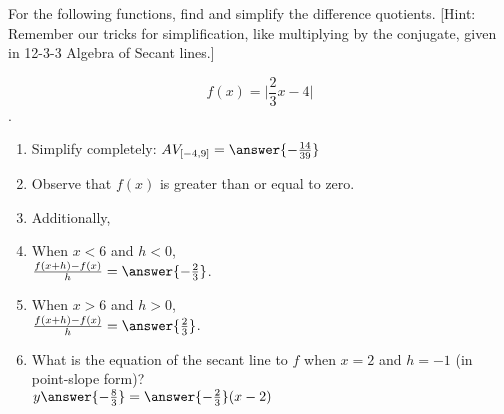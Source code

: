 \documentclass{ximera}
\author{Elizabeth Campolongo}
\begin{document}
\begin{exercise}

For the following functions, 
find and simplify the difference quotients. [Hint: Remember our tricks for simplification, like multiplying by the conjugate, given in 12-3-3 Algebra of Secant lines.]

$$f(x)= \Big|\frac{2}{3}x-4\Big|$$.

\begin{enumerate}

\item Simplify completely:
$AV_{[-4,9]} = \answer{-\frac{14}{39}}$
\item Observe that $f(x)$ is  greater than or equal to zero.
\item Additionally,
\begin{multipleChoice}
\end{multipleChoice}

\item When $x<6$ and $h<0$,\\
$\frac{f(x+h)-f(x)}{h} = \answer{-\frac{2}{3}}$.  

\item When $x>6$ and $h>0$,\\
$\frac{f(x+h)-f(x)}{h} = \answer{\frac{2}{3}}$.  

\item What is the equation of the secant line to $f$ when $x = 2$ and $h=-1$ (in point-slope form)?\\
$y\answer{-\frac{8}{3}}= \answer{-\frac{2}{3}}(x-2)$

\end{enumerate}
\end{exercise}
\end{document}
